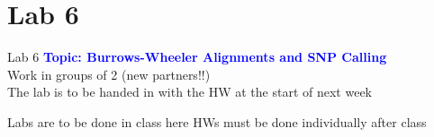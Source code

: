 \documentclass{beamer}
\newcommand{\blu}[1]{\textcolor{blue}{\textbf{#1}}}
\begin{document}
\section{Lab 6}

\begin{frame}{Lab 6}
    \blu{Topic: Burrows-Wheeler Alignments and SNP Calling}\\
    \bigskip
    Work in groups of 2 (new partners!!)\\
    \bigskip
    The lab is to be handed in with the HW at the start of next week
    \begin{outline}
        \1 Labs are to be done in class here
        \1 HWs must be done individually after class
    \end{outline}
\end{frame}
\end{document}

